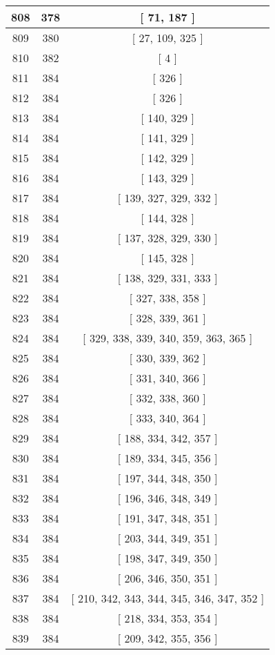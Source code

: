 \begin{center}
\begin{longtable}[H]{|| c c c ||}
\hline
808 & 378 & [ 71, 187 ] \\ 
\hline
809 & 380 & [ 27, 109, 325 ] \\ 
\hline
810 & 382 & [ 4 ] \\ 
\hline
811 & 384 & [ 326 ] \\ 
\hline
812 & 384 & [ 326 ] \\ 
\hline
813 & 384 & [ 140, 329 ] \\ 
\hline
814 & 384 & [ 141, 329 ] \\ 
\hline
815 & 384 & [ 142, 329 ] \\ 
\hline
816 & 384 & [ 143, 329 ] \\ 
\hline
817 & 384 & [ 139, 327, 329, 332 ] \\ 
\hline
818 & 384 & [ 144, 328 ] \\ 
\hline
819 & 384 & [ 137, 328, 329, 330 ] \\ 
\hline
820 & 384 & [ 145, 328 ] \\ 
\hline
821 & 384 & [ 138, 329, 331, 333 ] \\ 
\hline
822 & 384 & [ 327, 338, 358 ] \\ 
\hline
823 & 384 & [ 328, 339, 361 ] \\ 
\hline
824 & 384 & [ 329, 338, 339, 340, 359, 363, 365 ] \\ 
\hline
825 & 384 & [ 330, 339, 362 ] \\ 
\hline
826 & 384 & [ 331, 340, 366 ] \\ 
\hline
827 & 384 & [ 332, 338, 360 ] \\ 
\hline
828 & 384 & [ 333, 340, 364 ] \\ 
\hline
829 & 384 & [ 188, 334, 342, 357 ] \\ 
\hline
830 & 384 & [ 189, 334, 345, 356 ] \\ 
\hline
831 & 384 & [ 197, 344, 348, 350 ] \\ 
\hline
832 & 384 & [ 196, 346, 348, 349 ] \\ 
\hline
833 & 384 & [ 191, 347, 348, 351 ] \\ 
\hline
834 & 384 & [ 203, 344, 349, 351 ] \\ 
\hline
835 & 384 & [ 198, 347, 349, 350 ] \\ 
\hline
836 & 384 & [ 206, 346, 350, 351 ] \\ 
\hline
837 & 384 & [ 210, 342, 343, 344, 345, 346, 347, 352 ] \\ 
\hline
838 & 384 & [ 218, 334, 353, 354 ] \\ 
\hline
839 & 384 & [ 209, 342, 355, 356 ] \\ 

\end{longtable}
\end{center}
